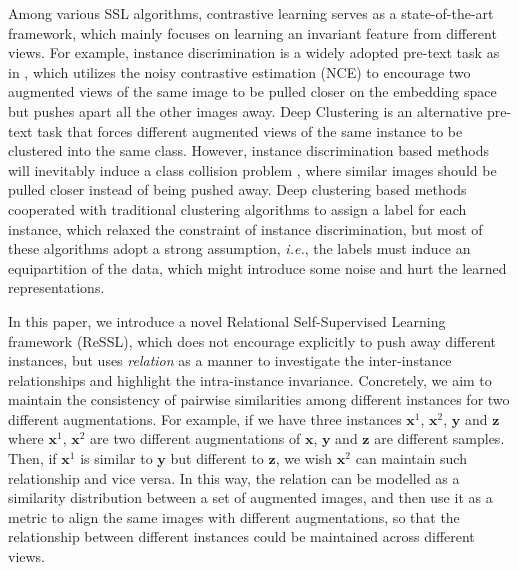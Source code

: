 \documentclass{article}
\newcommand{\<}{\left\langle}
\renewcommand{\>}{\right\rangle}
\newcommand{\ie}{{\emph{i.e.}}}
\begin{document}
Among various SSL algorithms, contrastive learning \cite{instance_discrimination, alignment_uniformity, simclr} serves as a state-of-the-art framework, which mainly focuses on learning an invariant feature from different views. For example, instance discrimination is a widely adopted pre-text task as in \cite{simclr, moco, instance_discrimination},  which utilizes the noisy contrastive estimation (NCE) to encourage two augmented views of the same image to be pulled closer on the embedding space but pushes apart all the other images away. Deep Clustering \cite{deepclustering, Self-labelling, swav} is an alternative pre-text task that forces different augmented views of the same instance to be clustered into the same class. However, instance discrimination based methods will inevitably induce a class collision problem \cite{contrastive_theory, PCL, debiased},  where similar images should be pulled closer instead of being pushed away. Deep clustering based methods cooperated with traditional clustering algorithms to assign a label for each instance, which relaxed the constraint of instance discrimination, but most of these algorithms adopt a strong assumption, \ie, the labels must induce an equipartition of the data, which might introduce some noise and hurt the learned representations.




In this paper, we introduce a novel Relational Self-Supervised Learning framework (ReSSL), which does not encourage explicitly to push away different instances, but uses \textit{relation} as a manner to investigate the inter-instance relationships and highlight the intra-instance invariance. Concretely, we aim to maintain the consistency of pairwise similarities among different instances for two different augmentations. For example, if we have three instances  $\mathbf{x}^1$, $\mathbf{x}^2$, $\mathbf{y}$ and $\mathbf{z}$ where $\mathbf{x}^1$, $\mathbf{x}^2$ are two different augmentations of $\mathbf{x}$,  $\mathbf{y}$ and $\mathbf{z}$ are different samples. Then, if $\mathbf{x}^1$ is similar to $\mathbf{y}$ but different to $\mathbf{z}$, we wish $\mathbf{x}^2$ can maintain such relationship and vice versa. In this way, the relation can be modelled as a similarity distribution between a set of augmented images, and then use it as a metric to align the same images with different augmentations, so that the relationship between different instances could be maintained across different views. 
\end{document}

